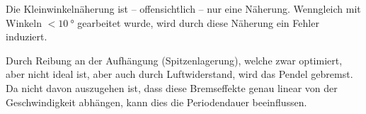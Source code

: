 Die Kleinwinkelnäherung ist – offensichtlich – nur eine Näherung.
Wenngleich mit Winkeln $< \SI{10}{\degree}$ gearbeitet wurde,
wird durch diese Näherung ein Fehler induziert.

Durch Reibung an der Aufhängung (Spitzenlagerung),
welche zwar optimiert, aber nicht ideal ist,
aber auch durch Luftwiderstand,
wird das Pendel gebremst.
Da nicht davon auszugehen ist,
dass diese Bremseffekte genau linear von der Geschwindigkeit abhängen,
kann dies die Periodendauer beeinflussen.
